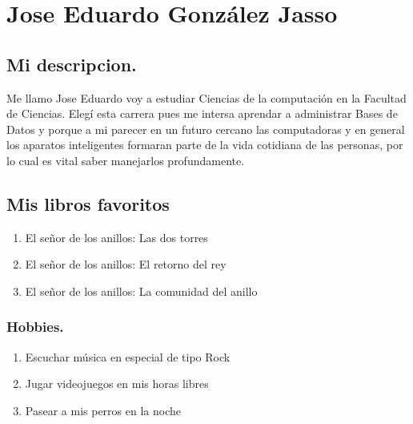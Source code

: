 \chapter{Jose Eduardo González Jasso}
\section{Mi descripcion.}
Me llamo Jose Eduardo voy a estudiar Ciencias de la computación en la Facultad de Ciencias. Elegí esta carrera pues me intersa aprendar a administrar Bases de Datos y porque a mi parecer en un futuro cercano las computadoras y en general los aparatos inteligentes formaran parte de la vida cotidiana de las personas, por lo cual es vital saber manejarlos profundamente.

\section{Mis libros favoritos}
\begin{enumerate}
\item El señor de los anillos: Las dos torres ~\cite{torres}
\item El señor de los anillos: El retorno del rey ~\cite{retorno}
\item El señor de los anillos: La comunidad del anillo ~\cite{comunidad}
\end{enumerate}
  

\subsection{Hobbies.}
\begin{enumerate}
\item Escuchar música en especial de tipo Rock
\item Jugar videojuegos en mis horas libres
\item Pasear a mis perros en la noche
\end{enumerate}

